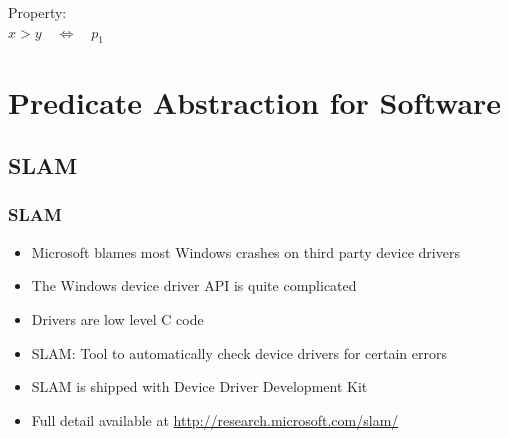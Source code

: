 \begin{frame}
\vfill

\begin{minipage}{.3\textwidth}
Property:\\
\qquad$x>y \quad \iff\quad p_1$
\end{minipage}
\hfill{}

\end{frame}


\section{Predicate Abstraction for Software}

\subsection{SLAM}

\begin{frame}
\frametitle{SLAM}
\begin{itemize}
\item Microsoft blames most Windows crashes on
\alert{third party device drivers}
\vfill

\item The Windows device driver API is quite complicated
\vfill

\item Drivers are low level C code
\vfill

\item SLAM: Tool to automatically check
device drivers for certain errors
\vfill

\item SLAM is shipped with Device Driver Development Kit
\vfill

\item Full detail available at
\url{http://research.microsoft.com/slam/}
\end{itemize}

\end{frame}


